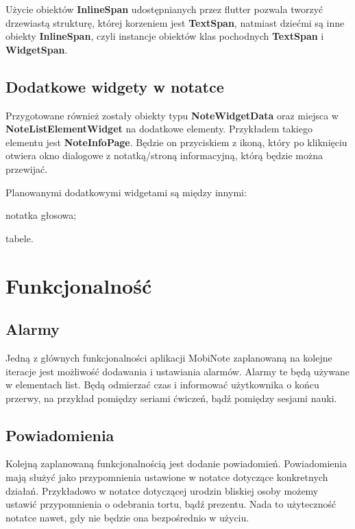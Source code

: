 Użycie obiektów \textbf{InlineSpan} udostępnianych przez flutter pozwala tworzyć drzewiastą strukturę, której korzeniem jest \textbf{TextSpan}, natmiast dziećmi są inne obiekty \textbf{InlineSpan}, czyli instancje obiektów klas pochodnych \textbf{TextSpan} i \textbf{WidgetSpan}.

\subsection{Dodatkowe widgety w notatce}

Przygotowane również zostały obiekty typu \textbf{NoteWidgetData} oraz miejsca w \textbf{NoteListElementWidget} na dodatkowe elementy. Przykładem takiego elementu jest \textbf{NoteInfoPage}. Będzie on przyciskiem z ikoną, który po kliknięciu otwiera okno dialogowe z notatką/stroną informacyjną, którą będzie można przewijać.

Planowanymi dodatkowymi widgetami są między innymi:

\begin{compactitem}
    \item notatka głosowa;
    \item tabele.
\end{compactitem}

\section{Funkcjonalność}

\subsection{Alarmy}

Jedną z głównych funkcjonalności aplikacji MobiNote zaplanowaną na kolejne iteracje jest możliwość dodawania i ustawiania alarmów. Alarmy te będą używane w elementach list. Będą odmierzać czas i informować użytkownika o końcu przerwy, na przykład pomiędzy seriami ćwiczeń, bądź pomiędzy sesjami nauki.

\subsection{Powiadomienia}

Kolejną zaplanowaną funkcjonalnością jest dodanie powiadomień. Powiadomienia mają służyć jako przypomnienia ustawione w notatce dotyczące konkretnych działań. Przykładowo w notatce dotyczącej urodzin bliskiej osoby możemy ustawić przypomnienia o odebrania tortu, bądź prezentu. Nada to użyteczność notatce nawet, gdy nie będzie ona bezpośrednio w użyciu.

